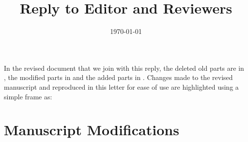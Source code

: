 \documentclass{article}
\title{Reply to Editor and Reviewers}
\author{}
\date{\today}
\begin{document}
\maketitle

In the revised document that we join with this reply, the deleted old parts are in , the modified parts in 
and the added parts in .
%
Changes made to the revised manuscript and reproduced in this letter for ease of use are highlighted using a simple frame as:


\section{Manuscript Modifications}

\vspace{4mm}
\end{document}
